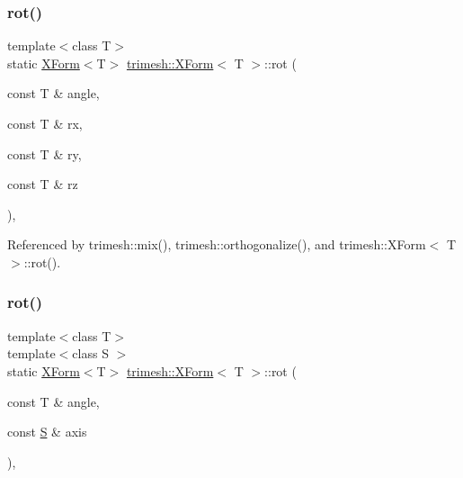 \mbox{\label{classtrimesh_1_1XForm_a522678b276348f5bf91553a1e5f88972}} 
\subsubsection{\texorpdfstring{rot()}{rot()}\hspace{0.1cm}{\footnotesize\ttfamily [1/2]}}
{\footnotesize\ttfamily template$<$class T$>$ \\
static \hyperlink{classtrimesh_1_1XForm}{X\+Form}$<$T$>$ \hyperlink{classtrimesh_1_1XForm}{trimesh\+::\+X\+Form}$<$ T $>$\+::rot (\begin{DoxyParamCaption}\item[{const T \&}]{angle,  }\item[{const T \&}]{rx,  }\item[{const T \&}]{ry,  }\item[{const T \&}]{rz }\end{DoxyParamCaption})\hspace{0.3cm}{\ttfamily [inline]}, {\ttfamily [static]}}



Referenced by trimesh\+::mix(), trimesh\+::orthogonalize(), and trimesh\+::\+X\+Form$<$ T $>$\+::rot().

\mbox{\label{classtrimesh_1_1XForm_a5980fc1b56390c0b23f3ffb966c4e54e}} 
\subsubsection{\texorpdfstring{rot()}{rot()}\hspace{0.1cm}{\footnotesize\ttfamily [2/2]}}
{\footnotesize\ttfamily template$<$class T$>$ \\
template$<$class S $>$ \\
static \hyperlink{classtrimesh_1_1XForm}{X\+Form}$<$T$>$ \hyperlink{classtrimesh_1_1XForm}{trimesh\+::\+X\+Form}$<$ T $>$\+::rot (\begin{DoxyParamCaption}\item[{const T \&}]{angle,  }\item[{const \hyperlink{ego_8cc_abde73cd36321648268fb4543509b996a}{S} \&}]{axis }\end{DoxyParamCaption})\hspace{0.3cm}{\ttfamily [inline]}, {\ttfamily [static]}}

